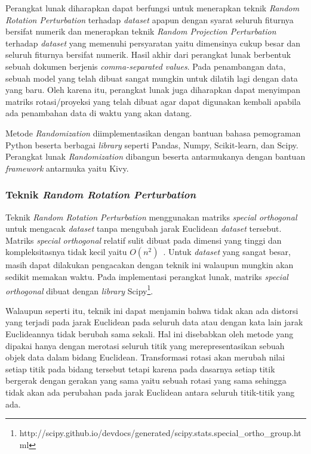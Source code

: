 Perangkat lunak diharapkan dapat berfungsi untuk menerapkan teknik \textit{Random Rotation Perturbation} terhadap \textit{dataset} apapun dengan syarat seluruh fiturnya bersifat numerik dan menerapkan teknik \textit{Random Projection Perturbation} terhadap \textit{dataset} yang memenuhi persyaratan yaitu dimensinya cukup besar dan seluruh fiturnya bersifat numerik. Hasil akhir dari perangkat lunak berbentuk sebuah dokumen berjenis \textit{comma-separated values}. Pada penambangan data, sebuah model yang telah dibuat sangat mungkin untuk dilatih lagi dengan data yang baru. Oleh karena itu, perangkat lunak juga diharapkan dapat menyimpan matriks rotasi/proyeksi yang telah dibuat agar dapat digunakan kembali apabila ada penambahan data di waktu yang akan datang.

Metode \textit{Randomization} diimplementasikan dengan bantuan bahasa pemograman Python beserta berbagai \textit{library} seperti Pandas, Numpy, Scikit-learn, dan Scipy. Perangkat lunak \textit{Randomization} dibangun beserta antarmukanya dengan bantuan \textit{framework} antarmuka yaitu Kivy.

\subsubsection{Teknik \textit{Random Rotation Perturbation}}
\label{subsubsec:analisis-rrp}

Teknik \textit{Random Rotation Perturbation} menggunakan matriks \textit{special orthogonal} untuk mengacak \textit{dataset} tanpa mengubah jarak Euclidean \textit{dataset} tersebut. Matriks \textit{special orthogonal} relatif sulit dibuat pada dimensi yang tinggi dan kompleksitasnya tidak kecil yaitu \(O(n^2)\)~\cite{stewart:80:orthogonal}. Untuk \textit{dataset} yang sangat besar, masih dapat dilakukan pengacakan dengan teknik ini walaupun mungkin akan sedikit memakan waktu. Pada implementasi perangkat lunak, matriks \textit{special orthogonal} dibuat dengan \textit{library} Scipy\footnote{http://scipy.github.io/devdocs/generated/scipy.stats.special\_ortho\_group.html}.

Walaupun seperti itu, teknik ini dapat menjamin bahwa tidak akan ada distorsi yang terjadi pada jarak Euclidean pada seluruh data atau dengan kata lain jarak Euclideannya tidak berubah sama sekali. Hal ini disebabkan oleh metode yang dipakai hanya dengan merotasi seluruh titik yang merepresentasikan sebuah objek data dalam bidang Euclidean. Transformasi rotasi akan merubah nilai setiap titik pada bidang tersebut tetapi karena pada dasarnya setiap titik bergerak dengan gerakan yang sama yaitu sebuah rotasi yang sama sehingga tidak akan ada perubahan pada jarak Euclidean antara seluruh titik-titik yang ada.

